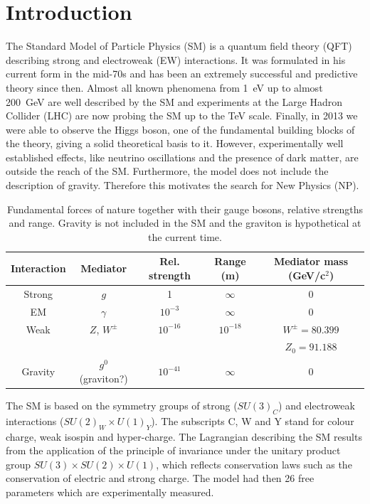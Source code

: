 \chapter{Introduction}
\label{ch:introduction}

The Standard Model of Particle Physics (SM) is a quantum field theory (QFT) describing strong and electroweak (EW) interactions.
It was formulated in his current form in the mid-70s and has been an extremely successful and predictive theory since then.
Almost all known phenomena from 1~eV up to almost 200~GeV are well described by the SM and experiments at the Large Hadron
Collider (LHC) are now probing the SM up to the TeV scale.
Finally, in 2013 we were able to observe the Higgs boson, one of the fundamental building blocks of the theory,
giving a solid theoretical basis to it. However, experimentally well established effects, like neutrino
oscillations and the presence of dark matter, are outside the reach of the SM. Furthermore, the model does not include
the description of gravity. Therefore this motivates the search for New Physics (NP).

\begin{table}[h!]
\begin{tabular}{|c|c|c|c|c|}
Interaction	& Mediator	& Rel. strength	& Range	(m)	& Mediator mass (GeV/c${}^2$) \\
\hline
Strong		& $g$		& 1			& $\infty$		& 0		\\
EM			& $\gamma$	& $10^{-3}$		& $\infty$ 		& 0		\\
Weak		& $Z$, $W^\pm$	& $10^{-16}$		& $10^{-18}$	& $W^\pm = 80.399$ \\
			&		&			&		& $Z_0 = 91.188$	\\
Gravity		& $g^0$ (graviton?) & $10^{-41}$	& $\infty$		& 0		\\
\end{tabular}
\caption{Fundamental forces of nature together with their gauge bosons, relative strengths and range.
Gravity is not included in the SM and the graviton is hypothetical at the current time.}
\label{tab:interactions}
\end{table}

The SM is based on the symmetry groups of strong ($SU(3)_C$) and electroweak interactions ($SU(2)_W \times U(1)_Y$).
The subscripts C, W and Y stand for colour charge, weak isospin and hyper-charge. The Lagrangian describing the
SM results from the application of the principle of invariance under the unitary product group $SU(3) \times SU(2) \times U(1)$,
which reflects conservation laws such as the conservation of electric and strong charge.
The model had then 26 free parameters which are experimentally measured.

